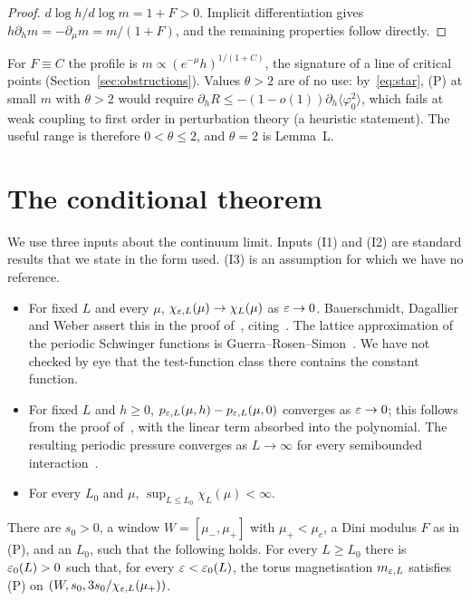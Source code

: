 \begin{proof}
$d\log h/d\log m=1+F>0$. Implicit differentiation gives $h\partial_hm=-\partial_\mu m=m/(1+F)$, and the remaining properties follow directly.
\end{proof}

For $F\equiv C$ the profile is $m\propto(e^{-\mu}h)^{1/(1+C)}$, the signature of a line of critical points (Section~\ref{sec:obstructions}). Values $\theta>2$ are of no use: by~\eqref{eq:star}, (P) at small $m$ with $\theta>2$ would require $\partial_hR\le-(1-o(1))\partial_h\langle\varphi_0^2\rangle$, which fails at weak coupling to first order in perturbation theory (a heuristic statement). The useful range is therefore $0<\theta\le2$, and $\theta=2$ is Lemma~L.

\section{The conditional theorem}\label{sec:conditional}

We use three inputs about the continuum limit. Inputs (I1) and (I2) are standard results that we state in the form used. (I3) is an assumption for which we have no reference.

\begin{itemize}
\item[(I1)] For fixed $L$ and every $\mu$, $\chi_{\varepsilon,L}(\mu)\to\chi_L(\mu)$ as $\varepsilon\to0$. Bauerschmidt, Dagallier and Weber assert this in the proof of~\cite[Thm.~2.9]{BDW25}, citing~\cite[Sect.~8]{BFS83}. The lattice approximation of the periodic Schwinger functions is Guerra--Rosen--Simon~\cite[Thm.~IX.5]{GRS76}. We have not checked by eye that the test-function class there contains the constant function.
\item[(I2)] For fixed $L$ and $h\ge0$, $p_{\varepsilon,L}(\mu,h)-p_{\varepsilon,L}(\mu,0)$ converges as $\varepsilon\to0$; this follows from the proof of~\cite[Thm.~IX.5]{GRS76}, with the linear term absorbed into the polynomial. The resulting periodic pressure converges as $L\to\infty$ for every semibounded interaction~\cite[Thm.~1.1, Thm.~VI.1]{GRS76}.
\item[(I3)] For every $L_0$ and $\mu$, $\sup_{L\le L_0}\chi_L(\mu)<\infty$.
\end{itemize}

\begin{hypothesis}[$\mathrm{H}_F$]
There are $s_0>0$, a window $W=[\mu_-,\mu_+]$ with $\mu_+<\mu_c$, a Dini modulus $F$ as in (P), and an $L_0$, such that the following holds. For every $L\ge L_0$ there is $\varepsilon_0(L)>0$ such that, for every $\varepsilon<\varepsilon_0(L)$, the torus magnetisation $m_{\varepsilon,L}$ satisfies (P) on $(W,s_0,3s_0/\chi_{\varepsilon,L}(\mu_+))$.
\end{hypothesis}

